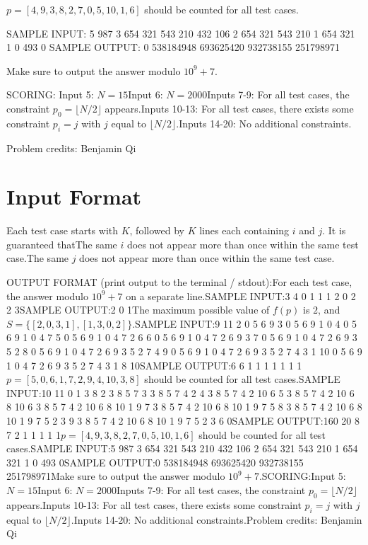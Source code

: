 \documentclass[12pt]{article}
\begin{document}
$p=[4, 9, 3, 8, 2, 7, 0, 5, 10, 1, 6]$ should be counted for all test cases.

SAMPLE INPUT:
5 987
3
654 321
543 210
432 106
2
654 321
543 210
1
654 321
1
0 493
0
SAMPLE OUTPUT: 
0
538184948
693625420
932738155
251798971

Make sure to output the answer modulo $10^9+7$.

SCORING:
Input 5: $N=15$Input 6: $N=2000$Inputs 7-9: For all test cases, the constraint $p_0=\lfloor N/2\rfloor$
appears.Inputs 10-13: For all test cases, there exists some constraint $p_i = j$
with $j$ equal to
$\lfloor N/2\rfloor$.Inputs 14-20: No additional constraints.


Problem credits: Benjamin Qi



\section*{Input Format}
Each test case starts with $K$, followed by $K$ lines each containing $i$ and
$j$. It is guaranteed thatThe same $i$ does not appear more than once within the same test case.The same $j$ does not appear more than once within the same test case.

OUTPUT FORMAT (print output to the terminal / stdout):For each test case, the answer modulo $10^9+7$ on a separate line.SAMPLE INPUT:3 4
0
1
1 1
2
0 2
2 3SAMPLE OUTPUT:2
0
1The maximum possible value of $f(p)$ is $2$, and $S=\{[2,0,3,1], [1,3,0,2]\}$.SAMPLE INPUT:9 11
2
0 5
6 9
3
0 5
6 9
1 0
4
0 5
6 9
1 0
4 7
5
0 5
6 9
1 0
4 7
2 6
6
0 5
6 9
1 0
4 7
2 6
9 3
7
0 5
6 9
1 0
4 7
2 6
9 3
5 2
8
0 5
6 9
1 0
4 7
2 6
9 3
5 2
7 4
9
0 5
6 9
1 0
4 7
2 6
9 3
5 2
7 4
3 1
10
0 5
6 9
1 0
4 7
2 6
9 3
5 2
7 4
3 1
8 10SAMPLE OUTPUT:6
6
1
1
1
1
1
1
1$p=[5, 0, 6, 1, 7, 2, 9, 4, 10, 3, 8]$ should be counted for all test cases.SAMPLE INPUT:10 11
0
1
3 8
2
3 8
5 7
3
3 8
5 7
4 2
4
3 8
5 7
4 2
10 6
5
3 8
5 7
4 2
10 6
8 10
6
3 8
5 7
4 2
10 6
8 10
1 9
7
3 8
5 7
4 2
10 6
8 10
1 9
7 5
8
3 8
5 7
4 2
10 6
8 10
1 9
7 5
2 3
9
3 8
5 7
4 2
10 6
8 10
1 9
7 5
2 3
6 0SAMPLE OUTPUT:160
20
8
7
2
1
1
1
1
1$p=[4, 9, 3, 8, 2, 7, 0, 5, 10, 1, 6]$ should be counted for all test cases.SAMPLE INPUT:5 987
3
654 321
543 210
432 106
2
654 321
543 210
1
654 321
1
0 493
0SAMPLE OUTPUT:0
538184948
693625420
932738155
251798971Make sure to output the answer modulo $10^9+7$.SCORING:Input 5: $N=15$Input 6: $N=2000$Inputs 7-9: For all test cases, the constraint $p_0=\lfloor N/2\rfloor$
appears.Inputs 10-13: For all test cases, there exists some constraint $p_i = j$
with $j$ equal to
$\lfloor N/2\rfloor$.Inputs 14-20: No additional constraints.Problem credits: Benjamin Qi
\end{document}
